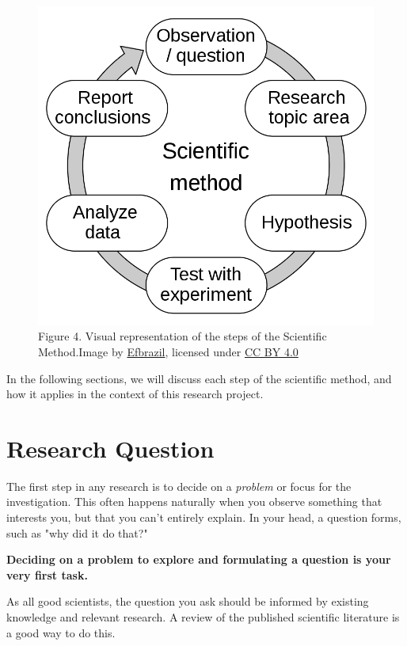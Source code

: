 \documentclass[
]{book}
\begin{document}
\begin{figure}
\centering
\includegraphics{figures_images/Lab2b-Fig1.png}
\caption{Figure 4. Visual representation of the steps of the Scientific Method.Image by \href{https://commons.wikimedia.org/wiki/File:The_Scientific_Method.svg}{Efbrazil}, licensed under \href{https://creativecommons.org/licenses/by/4.0/}{CC BY 4.0}}
\end{figure}

In the following sections, we will discuss each step of the scientific method, and how it applies in the context of this research project.

\hypertarget{research-question}{%
\section{Research Question}\label{research-question}}

The first step in any research is to decide on a \emph{problem} or focus for the investigation. This often happens naturally when you observe something that interests you, but that you can't entirely explain. In your head, a question forms, such as "why did it do that?"

\textbf{Deciding on a problem to explore and formulating a question is your very first task.}

As all good scientists, the question you ask should be informed by existing knowledge and relevant research. A review of the published scientific literature is a good way to do this.
\end{document}
